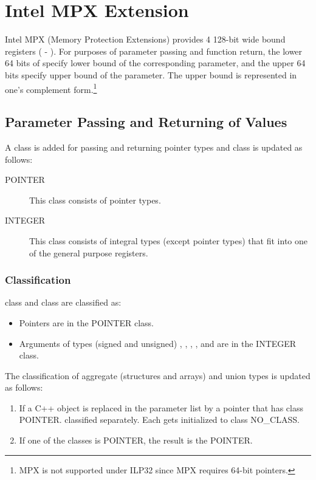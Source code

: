 \chapter{Intel MPX Extension}

Intel MPX (Memory Protection Extensions) provides 4 128-bit wide bound
registers ( - ).  For purposes of parameter passing
and function return, the lower 64 bits of  specify lower bound
of the corresponding parameter, and the upper 64 bits specify upper bound
of the parameter.  The upper bound is represented in one's complement
form.\footnote{MPX is not supported under ILP32 since MPX requires 64-bit
pointers.}

\section{Parameter Passing and Returning of Values}
\label{mpx-calling-conventions}

A  class is added for passing and returning pointer types
and  class is updated as follows:

\begin{description}
\item[POINTER] This class consists of pointer types.
\item[INTEGER] This class consists of integral types (except pointer types)
  that fit into one of the general purpose registers.
\end{description}

\subsection{Classification}

 class and  class are classified as:

\begin{itemize}
\item Pointers are in the POINTER class.
\item Arguments of types (signed and unsigned) , ,
  , ,  and 
  are in the INTEGER class.
\end{itemize}

The classification of aggregate (structures and arrays) and union
types is updated as follows:

\begin{enumerate}
\item If a C++ object is replaced in the parameter list by a pointer that
    has class POINTER.
    classified separately.  Each \eightbyte gets initialized to class NO_CLASS.
\item If one of the classes is POINTER, the result is the POINTER.
\end{enumerate}

